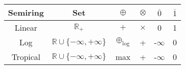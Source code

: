 \begingroup\centering
\begin{tabular}{c||c|c|c|c|c}
Semiring & Set & $\oplus$ & $\otimes$ & $\overline{0}$ & $\overline{1}$\\
\hline\hline
Linear   & $ \mathbb{R}_+$ & $+$ & $\times$ & 0 & 1\\
Log      & $ \mathbb{R} \cup \{ -\infty, +\infty \}$ & $\oplus_{\text{log}}$ & + & -$\infty$ & 0\\
Tropical & $ \mathbb{R} \cup \{ -\infty, +\infty \}$ & max & + & -$\infty$ & 0\\
\end{tabular}
\par\endgroup